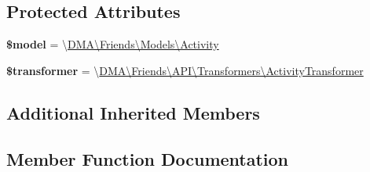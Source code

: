 \subsection*{Protected Attributes}
\begin{DoxyCompactItemize}
\item 
\hypertarget{classDMA_1_1Friends_1_1API_1_1Resources_1_1ActivityResource_a976c47842f6a25c165f60892c6bd0476}{}{\bfseries \$model} = \textquotesingle{}\textbackslash{}\hyperlink{classDMA_1_1Friends_1_1Models_1_1Activity}{D\+M\+A\textbackslash{}\+Friends\textbackslash{}\+Models\textbackslash{}\+Activity}\textquotesingle{}\label{classDMA_1_1Friends_1_1API_1_1Resources_1_1ActivityResource_a976c47842f6a25c165f60892c6bd0476}

\item 
\hypertarget{classDMA_1_1Friends_1_1API_1_1Resources_1_1ActivityResource_a896cc90a8f4e586e2cf26b73252b6f7f}{}{\bfseries \$transformer} = \textquotesingle{}\textbackslash{}\hyperlink{classDMA_1_1Friends_1_1API_1_1Transformers_1_1ActivityTransformer}{D\+M\+A\textbackslash{}\+Friends\textbackslash{}\+A\+P\+I\textbackslash{}\+Transformers\textbackslash{}\+Activity\+Transformer}\textquotesingle{}\label{classDMA_1_1Friends_1_1API_1_1Resources_1_1ActivityResource_a896cc90a8f4e586e2cf26b73252b6f7f}

\end{DoxyCompactItemize}
\subsection*{Additional Inherited Members}


\subsection{Member Function Documentation}
\hypertarget{classDMA_1_1Friends_1_1API_1_1Resources_1_1ActivityResource_a6e69dac62efaef2226446bcb4a9537d4}{}
